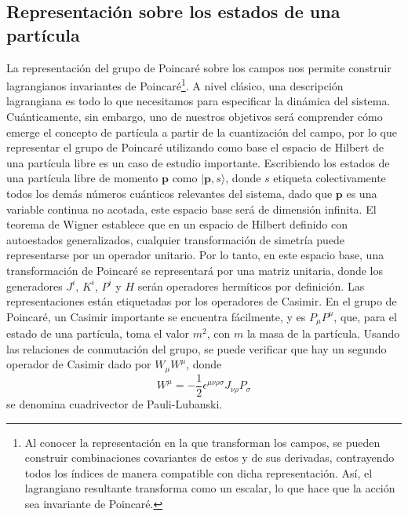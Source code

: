 \documentclass[a4paper,11pt]{book} %
\begin{document}
\subsection{Representación sobre los estados de una partícula}
\noindent
La representación del grupo de Poincaré sobre los campos nos permite construir lagrangianos invariantes de Poincaré\footnote{
Al conocer la representación en la que transforman los campos, se pueden construir combinaciones covariantes de estos y de sus derivadas, contrayendo todos los índices de manera compatible con dicha representación. Así, el lagrangiano resultante transforma como un escalar, lo que hace que la acción sea invariante de Poincaré.
}. A nivel clásico, una descripción lagrangiana es todo lo que necesitamos para especificar la dinámica del sistema. Cuánticamente, sin embargo, uno de nuestros objetivos será comprender cómo emerge el concepto de partícula a partir de la cuantización del campo, por lo que representar el grupo de Poincaré utilizando como base el espacio de Hilbert de una partícula libre es un caso de estudio importante. 
\medskip\newline
Escribiendo los estados de una partícula libre de momento $\mathbf{p}$ como $|\mathbf{p}, s\rangle$, donde $s$ etiqueta colectivamente todos los demás números cuánticos relevantes del sistema, dado que $\mathbf{p}$ es una variable continua no acotada, este espacio base será de dimensión infinita. 
\medskip\newline
El teorema de Wigner establece que en un espacio de Hilbert definido con autoestados generalizados, cualquier transformación de simetría puede representarse por un operador unitario. Por lo tanto, en este espacio base, una transformación de Poincaré se representará por una matriz unitaria, donde los generadores $J^{i}$, $K^{i}$, $P^{i}$ y $H$ serán operadores hermíticos por definición.
\medskip\newline
Las representaciones están etiquetadas por los operadores de Casimir. En el grupo de Poincaré, un Casimir importante se encuentra fácilmente, y es $P_{\mu}P^{\mu}$, que, para el estado de una partícula, toma el valor $m^{2}$, con $m$ la masa de la partícula. Usando las relaciones de conmutación del grupo, se puede verificar que hay un segundo operador de Casimir dado por $W_{\mu}W^{\mu}$, donde 
\begin{equation}
W^{\mu}=-\frac{1}{2}\epsilon^{\mu\nu\rho\sigma}J_{\nu\rho}P_{\sigma}
\end{equation} 
se denomina cuadrivector de Pauli-Lubanski. 
\medskip\newline
\end{document}
